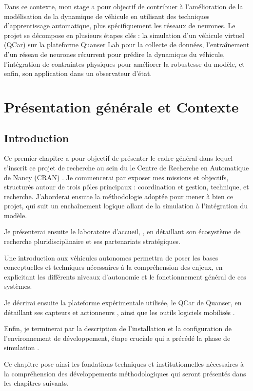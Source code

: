 \documentclass[12pt, a4paper]{report}
\begin{document}
Dans ce contexte, mon stage a pour objectif de contribuer à l'amélioration de la modélisation de la dynamique de véhicule en utilisant des techniques d'apprentissage automatique, plus spécifiquement les réseaux de neurones. Le projet se décompose en plusieurs étapes clés : la simulation d'un véhicule virtuel (QCar) sur la plateforme Quanser Lab pour la collecte de données, l'entraînement d'un réseau de neurones récurrent pour prédire la dynamique du véhicule, l'intégration de contraintes physiques pour améliorer la robustesse du modèle, et enfin, son application dans un observateur d'état.



\chapter{Présentation générale et Contexte}
\thispagestyle{fancy}

\section{Introduction }

Ce premier chapitre a pour objectif de présenter le cadre général dans lequel s'inscrit ce projet de recherche au sein du le Centre de Recherche en Automatique de Nancy (CRAN) . Je commencerai par exposer mes missions et objectifs, structurés autour de trois pôles principaux : coordination et gestion, technique, et recherche. J'aborderai ensuite la méthodologie adoptée pour mener à bien ce projet, qui suit un enchaînement logique allant de la simulation à l'intégration du modèle.

Je présenterai ensuite le laboratoire d'accueil, , en détaillant son écosystème de recherche pluridisciplinaire et ses partenariats stratégiques.

Une introduction aux véhicules autonomes permettra de poser les bases conceptuelles et techniques nécessaires à la compréhension des enjeux, en explicitant les différents niveaux d'autonomie et le fonctionnement général de ces systèmes.

Je décrirai ensuite la plateforme expérimentale utilisée, le QCar de Quanser, en détaillant ses capteurs  et actionneurs , ainsi que les outils logiciels mobilisés .

Enfin, je terminerai par la description de l'installation et la configuration de l'environnement de développement, étape cruciale qui a précédé la phase de simulation .

Ce chapitre pose ainsi les fondations techniques et institutionnelles nécessaires à la compréhension des développements méthodologiques qui seront présentés dans les chapitres suivants.
 \newpage
\end{document}
